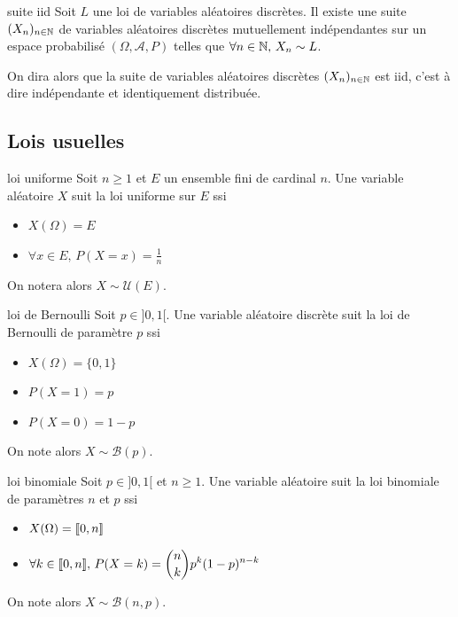 \begin{corollaire}{suite iid}{}
    Soit $L$ une loi de variables aléatoires discrètes. Il existe une suite 
    $(X_n)_{n \in \mathbb{N}}$ de variables aléatoires discrètes mutuellement indépendantes
    sur un espace probabilisé $(\Omega, \mathcal A, P)$ telles que $\forall n \in \mathbb{N}, \, X_n \sim L$.

    On dira alors que la suite de variables aléatoires discrètes $(X_n)_{n \in \mathbb{N}}$ 
    est iid, c'est à dire indépendante et identiquement distribuée.
\end{corollaire}

\subsection{Lois usuelles}

\begin{definition}{loi uniforme}{}
    Soit $n \geqslant 1$ et $E$ un ensemble fini de cardinal $n$. Une variable aléatoire $X$ suit la 
    loi uniforme sur $E$ ssi 
    \begin{itemize}
        \item $X(\Omega) = E$
        \item $\forall x \in E, \, P(X = x) = \frac 1 n$
    \end{itemize}

    On notera alors $X \sim \mathcal U(E)$.
\end{definition}


\begin{definition}{loi de Bernoulli}{}
    Soit $p \in ]0, 1[$. Une variable aléatoire discrète suit la loi de Bernoulli de paramètre 
    $p$ ssi 
    \begin{itemize}
        \item $X(\Omega) = \{0, 1\}$
        \item $P(X = 1) = p$ 
        \item $P(X = 0) = 1 - p$
    \end{itemize}
    On note alors $X \sim \mathcal B(p)$.
\end{definition}

\begin{definition}{loi binomiale}{}
    Soit $p \in ]0, 1[$ et $n \geqslant 1$. Une variable aléatoire suit la loi binomiale de 
    paramètres $n$ et $p$ ssi 
    \begin{itemize}
        \item $X(\Omega) = [\![0, n]\!]$
        \item $\displaystyle \forall k \in [\![0, n]\!], \, P(X = k) = \binom n k p^k (1 - p)^{n - k}$
    \end{itemize}
    On note alors $X \sim \mathcal B(n, p)$.
\end{definition}

